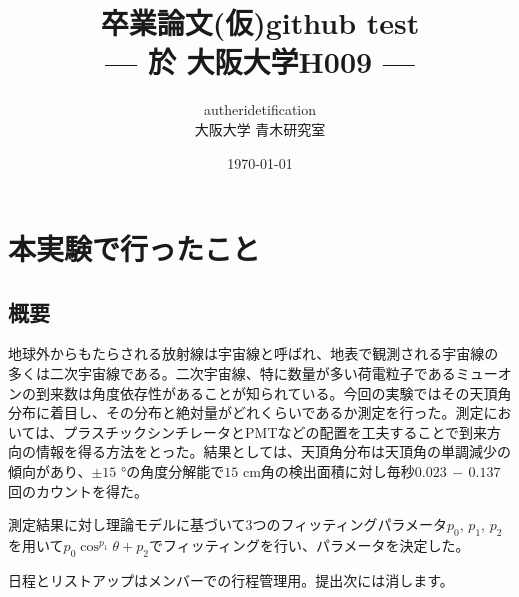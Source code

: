 \documentclass[a4paper,dvipdfmx,titlepage,oneside]{jsarticle}
\title{卒業論文(仮)github test
\large{\\--- 於 大阪大学H009 ---}}
\author{auther\quad\quad idetification\\大阪大学 青木研究室}
\date{\today}
\numberwithin{equation}{section}
\numberwithin{table}{section}
\numberwithin{figure}{section}
\begin{document}
	\maketitle
	\tableofcontents
\section{本実験で行ったこと}
	\subsection{概要}
		地球外からもたらされる放射線は宇宙線と呼ばれ、地表で観測される宇宙線の多くは二次宇宙線である。二次宇宙線、特に数量が多い荷電粒子であるミューオンの到来数は角度依存性があることが知られている。今回の実験ではその天頂角分布に着目し、その分布と絶対量がどれくらいであるか測定を行った。測定においては、プラスチックシンチレータとPMTなどの配置を工夫することで到来方向の情報を得る方法をとった。結果としては、天頂角分布は天頂角の単調減少の傾向があり、$\pm15$ \si{\degree}の角度分解能で$15$ cm角の検出面積に対し毎秒$0.023\,-\,0.137$回のカウントを得た。

		測定結果に対し理論モデルに基づいて3つのフィッティングパラメータ$p_0,\,p_1,\,p_2$を用いて$p_0\cos^{p_1}\theta+p_2$でフィッティングを行い、パラメータを決定した。

	\newpage
	日程とリストアップはメンバーでの行程管理用。提出次には消します。
\end{document}
